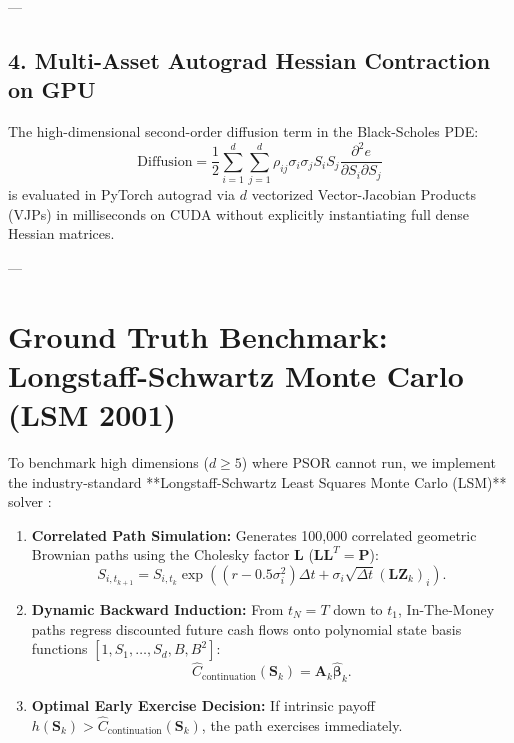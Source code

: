 \documentclass[11pt,a4paper]{article}
\begin{document}
---

\subsection{4. Multi-Asset Autograd Hessian Contraction on GPU}
The high-dimensional second-order diffusion term in the Black-Scholes PDE:
\begin{equation}
    \text{Diffusion} = \frac{1}{2}\sum_{i=1}^d \sum_{j=1}^d \rho_{ij} \sigma_i \sigma_j S_i S_j \frac{\partial^2 e}{\partial S_i \partial S_j}
\end{equation}
is evaluated in PyTorch autograd via $d$ vectorized Vector-Jacobian Products (VJPs) in milliseconds on CUDA without explicitly instantiating full dense Hessian matrices.

---

\section{Ground Truth Benchmark: Longstaff-Schwartz Monte Carlo (LSM 2001)}
To benchmark high dimensions ($d \ge 5$) where PSOR cannot run, we implement the industry-standard **Longstaff-Schwartz Least Squares Monte Carlo (LSM)** solver \cite{longstaff2001valuing}:
\begin{enumerate}[leftmargin=1.5em]
    \item \textbf{Correlated Path Simulation:} Generates 100,000 correlated geometric Brownian paths using the Cholesky factor $\mathbf{L}$ ($\mathbf{L}\mathbf{L}^T = \mathbf{P}$):
    \begin{equation}
        S_{i, t_{k+1}} = S_{i, t_k} \exp\left( (r - 0.5\sigma_i^2)\Delta t + \sigma_i \sqrt{\Delta t} (\mathbf{L}\mathbf{Z}_k)_i \right).
    \end{equation}
    \item \textbf{Dynamic Backward Induction:} From $t_N = T$ down to $t_1$, In-The-Money paths regress discounted future cash flows onto polynomial state basis functions $[1, S_1, \dots, S_d, B, B^2]$:
    \begin{equation}
        \hat{C}_{\text{continuation}}(\mathbf{S}_k) = \mathbf{A}_k \hat{\boldsymbol{\beta}}_k.
    \end{equation}
    \item \textbf{Optimal Early Exercise Decision:} If intrinsic payoff $h(\mathbf{S}_k) > \hat{C}_{\text{continuation}}(\mathbf{S}_k)$, the path exercises immediately.
\end{enumerate}
\end{document}
